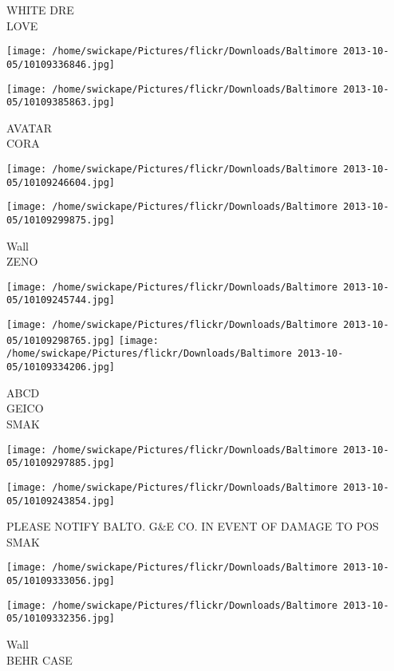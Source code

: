 \documentclass[10pt,letterpaper]{article}
\begin{document}
WHITE DRE\\
LOVE
\pagebreak

\texttt{[image: /home/swickape/Pictures/flickr/Downloads/Baltimore 2013-10-05/10109336846.jpg]}

\vspace{0.25in}
\texttt{[image: /home/swickape/Pictures/flickr/Downloads/Baltimore 2013-10-05/10109385863.jpg]}

AVATAR\\
CORA
\pagebreak

\texttt{[image: /home/swickape/Pictures/flickr/Downloads/Baltimore 2013-10-05/10109246604.jpg]}

\vspace{0.25in}
\texttt{[image: /home/swickape/Pictures/flickr/Downloads/Baltimore 2013-10-05/10109299875.jpg]}

Wall\\
ZENO
\pagebreak

\texttt{[image: /home/swickape/Pictures/flickr/Downloads/Baltimore 2013-10-05/10109245744.jpg]}

\vspace{0.25in}
\texttt{[image: /home/swickape/Pictures/flickr/Downloads/Baltimore 2013-10-05/10109298765.jpg]}
\texttt{[image: /home/swickape/Pictures/flickr/Downloads/Baltimore 2013-10-05/10109334206.jpg]}

ABCD\\
GEICO\\
SMAK
\pagebreak

\texttt{[image: /home/swickape/Pictures/flickr/Downloads/Baltimore 2013-10-05/10109297885.jpg]}

\vspace{0.25in}
\texttt{[image: /home/swickape/Pictures/flickr/Downloads/Baltimore 2013-10-05/10109243854.jpg]}

PLEASE NOTIFY BALTO. G\&E CO. IN EVENT OF DAMAGE TO POS\\
SMAK
\pagebreak

\texttt{[image: /home/swickape/Pictures/flickr/Downloads/Baltimore 2013-10-05/10109333056.jpg]}

\vspace{0.25in}
\texttt{[image: /home/swickape/Pictures/flickr/Downloads/Baltimore 2013-10-05/10109332356.jpg]}

Wall\\
BEHR CASE
\pagebreak
\end{document}
